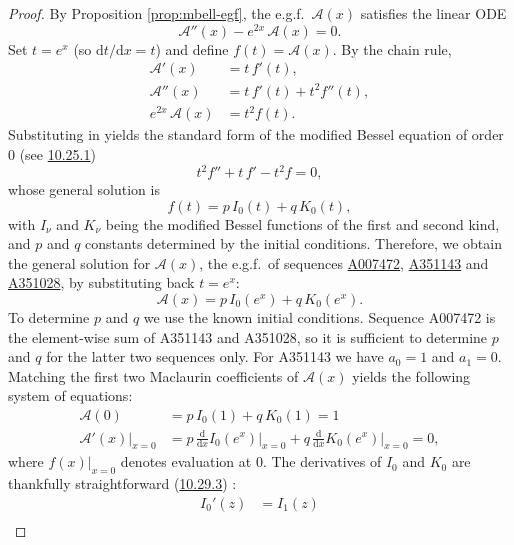 \documentclass[a4paper]{amsart}
\numberwithin{equation}{section}
\begin{document}
\begin{proof}
By Proposition \ref{prop:mbell-egf}, the e.g.f.\ $\mathcal{A}(x)$ satisfies the linear ODE
%
\[
\mathcal{A}''(x)-e^{2x}\,\mathcal{A}(x)=0.
\]
%
Set $t=e^{x}$ (so $\mathrm{d}t/\mathrm{d}x=t$) and define $f(t)=\mathcal{A}(x)$.  By the chain rule,
%
\[
\begin{aligned}
\mathcal{A}'(x) &= t\,f'(t),\\
\mathcal{A}''(x)&= t\,f'(t)+t^{2}f''(t),\\
e^{2x}\,\mathcal{A}(x) &= t^{2}f(t).
\end{aligned}
\]
%
Substituting in yields the standard form of the modified Bessel equation of order $0$ (see \href{https://dlmf.nist.gov/10.25.E1}{10.25.1}) \cite{NIST:DLMF}
%
\begin{equation}\label{eq-m2-ode}
t^{2}f''+t\,f'-t^{2}f=0,
\end{equation}
%
whose general solution is
%
\[
f(t)=p\,I_0(t)+q\,K_0(t),
\]
%
with $I_\nu$ and $K_\nu$ being the modified Bessel functions of the first and second kind, and $p$ and $q$ constants determined by the initial conditions. Therefore, we obtain the general solution for $\mathcal{A}(x)$, the e.g.f.\ of sequences \href{https://oeis.org/A007472}{A007472}, \href{https://oeis.org/A351143}{A351143} and \href{https://oeis.org/A351028}{A351028}, by substituting back $t=e^x$:
%
\begin{equation}
\mathcal{A}(x)=p\, I_0(e^x) + q\,K_0(e^x).
\end{equation}
%
To determine $p$ and $q$ we use the known initial conditions. Sequence A007472 is the element-wise sum of A351143 and A351028, so it is sufficient to determine $p$ and $q$ for the latter two sequences only. For A351143 we have $a_0 = 1$ and $a_1 = 0$. Matching the first two Maclaurin coefficients of $\mathcal{A}(x)$ yields the following system of equations:
%
\[
\begin{aligned}
\mathcal{A}(0) & = p\, I_0(1) + q\,K_0(1) = 1 \\
\mathcal{A}'(x)\bigr|_{x=0} &=p\, \tfrac{\mathrm{d}}{\mathrm{d}x}I_0(e^x)\bigr|_{x=0} + q\,\tfrac{\mathrm{d}}{\mathrm{d}x}K_0(e^x)\bigr|_{x=0} = 0,
\end{aligned}
\]
%
where $f(x)\bigr|_{x=0}$ denotes evaluation at 0. The derivatives of $I_0$ and $K_0$ are thankfully straightforward (\href{https://dlmf.nist.gov/10.29.E3}{10.29.3}) \cite{NIST:DLMF}:
%
\begin{equation}
\begin{aligned}
I_0'(z) &= I_1(z) \\

\end{aligned}
\end{equation}
\end{proof}
\end{document}
